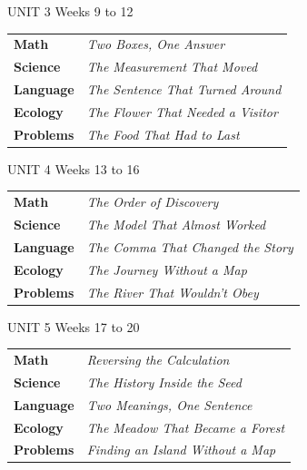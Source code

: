 \documentclass[10.5pt]{article}
\begin{document}
\begin{unitbox}{UNIT 3 \quad Weeks 9 to 12}
\begin{tabular}{@{}p{1.3in}p{2.5in}@{}}
\textcolor{hudorange}{\textbf{Math}} & \textit{Two Boxes, One Answer}\\
\textcolor{hudorange}{\textbf{Science}} & \textit{The Measurement That Moved}\\
\textcolor{hudorange}{\textbf{Language}} & \textit{The Sentence That Turned Around}\\
\textcolor{hudorange}{\textbf{Ecology}} & \textit{The Flower That Needed a Visitor}\\
\textcolor{hudorange}{\textbf{Problems}} & \textit{The Food That Had to Last}\\
\end{tabular}
\end{unitbox}

\begin{unitbox}{UNIT 4 \quad Weeks 13 to 16}
\begin{tabular}{@{}p{1.3in}p{2.5in}@{}}
\textcolor{hudorange}{\textbf{Math}} & \textit{The Order of Discovery}\\
\textcolor{hudorange}{\textbf{Science}} & \textit{The Model That Almost Worked}\\
\textcolor{hudorange}{\textbf{Language}} & \textit{The Comma That Changed the Story}\\
\textcolor{hudorange}{\textbf{Ecology}} & \textit{The Journey Without a Map}\\
\textcolor{hudorange}{\textbf{Problems}} & \textit{The River That Wouldn't Obey}\\
\end{tabular}
\end{unitbox}

\begin{unitbox}{UNIT 5 \quad Weeks 17 to 20}
\begin{tabular}{@{}p{1.3in}p{2.5in}@{}}
\textcolor{hudorange}{\textbf{Math}} & \textit{Reversing the Calculation}\\
\textcolor{hudorange}{\textbf{Science}} & \textit{The History Inside the Seed}\\
\textcolor{hudorange}{\textbf{Language}} & \textit{Two Meanings, One Sentence}\\
\textcolor{hudorange}{\textbf{Ecology}} & \textit{The Meadow That Became a Forest}\\
\textcolor{hudorange}{\textbf{Problems}} & \textit{Finding an Island Without a Map}\\
\end{tabular}
\end{unitbox}
\end{document}
